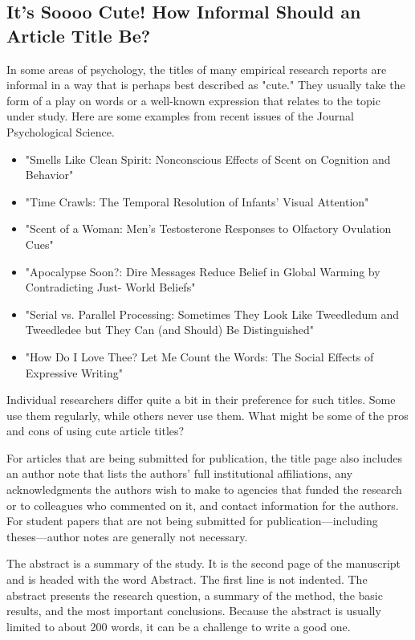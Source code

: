 \subsection{It's Soooo Cute! How Informal Should an Article Title Be?}


In some areas of psychology, the titles of many empirical research reports are informal in a way that is perhaps best described as "cute." They usually take the form of a play on words or a well-known expression that relates to the topic under study. Here are some examples from recent issues of the Journal Psychological Science.


\begin{itemize}
\item "Smells Like Clean Spirit: Nonconscious Effects of Scent on Cognition and Behavior"

\item "Time Crawls: The Temporal Resolution of Infants' Visual Attention"

\item "Scent of a Woman: Men's Testosterone Responses to Olfactory Ovulation Cues"

\item "Apocalypse Soon?: Dire Messages Reduce Belief in Global Warming by Contradicting Just-
World Beliefs"

\item "Serial vs. Parallel Processing: Sometimes They Look Like Tweedledum and Tweedledee but
They Can (and Should) Be Distinguished"

\item "How Do I Love Thee? Let Me Count the Words: The Social Effects of Expressive Writing"

\end{itemize}

Individual researchers differ quite a bit in their preference for such titles. Some use them regularly, while others never use them. What might be some of the pros and cons of using cute article titles?


For articles that are being submitted for publication, the title page also includes an author note that lists the authors' full institutional affiliations, any acknowledgments the authors wish to make to agencies that funded the research or to colleagues who commented on it, and contact information for the authors. For student papers that are not being submitted for publication---including theses---author notes are generally not necessary.


The abstract is a summary of the study. It is the second page of the manuscript and is headed with the word Abstract. The first line is not indented. The abstract presents the research question, a summary of the method, the basic results, and the most important conclusions. Because the abstract is usually limited to about 200 words, it can be a challenge to write a good one.


